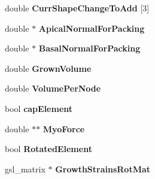 \begin{DoxyCompactItemize}
\item 
\hypertarget{classShapeBase_a3d48903871978d77a77cb77f569975c0}{}double {\bfseries Curr\+Shape\+Change\+To\+Add} \mbox{[}3\mbox{]}\label{classShapeBase_a3d48903871978d77a77cb77f569975c0}

\item 
\hypertarget{classShapeBase_ab84cbf988437cd20fcceee7a24d0c3a8}{}double $\ast$ {\bfseries Apical\+Normal\+For\+Packing}\label{classShapeBase_ab84cbf988437cd20fcceee7a24d0c3a8}

\item 
\hypertarget{classShapeBase_a87f03cc35ac66eeb14487c5f33097891}{}double $\ast$ {\bfseries Basal\+Normal\+For\+Packing}\label{classShapeBase_a87f03cc35ac66eeb14487c5f33097891}

\item 
\hypertarget{classShapeBase_a8a1bafcaf21f040dd137abfe434a75a9}{}double {\bfseries Grown\+Volume}\label{classShapeBase_a8a1bafcaf21f040dd137abfe434a75a9}

\item 
\hypertarget{classShapeBase_a59943ecb9f8ec139c0f564c1fb91d876}{}double {\bfseries Volume\+Per\+Node}\label{classShapeBase_a59943ecb9f8ec139c0f564c1fb91d876}

\item 
\hypertarget{classShapeBase_a21420915ac7c8444e0e5b5f4e98d7322}{}bool {\bfseries cap\+Element}\label{classShapeBase_a21420915ac7c8444e0e5b5f4e98d7322}

\item 
\hypertarget{classShapeBase_a3aedc120b16a922ee9b0c1595630694b}{}double $\ast$$\ast$ {\bfseries Myo\+Force}\label{classShapeBase_a3aedc120b16a922ee9b0c1595630694b}

\item 
\hypertarget{classShapeBase_af64f900d51cec3e48a488fdd8a51eacf}{}bool {\bfseries Rotated\+Element}\label{classShapeBase_af64f900d51cec3e48a488fdd8a51eacf}

\item 
\hypertarget{classShapeBase_acc1408c3e89b91787fec7e913cac1f58}{}gsl\+\_\+matrix $\ast$ {\bfseries Growth\+Strains\+Rot\+Mat}\label{classShapeBase_acc1408c3e89b91787fec7e913cac1f58}

\end{DoxyCompactItemize}
